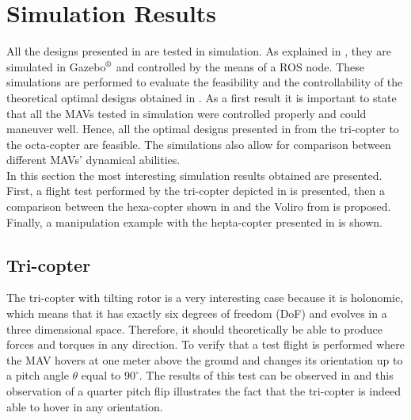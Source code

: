 \chapter{Simulation Results}
\label{sec:simulation_results}

All the designs presented in  are tested in simulation.
As explained in , they are simulated in
Gazebo$^\textrm{\textregistered}$ and controlled by the means of a ROS node.
These simulations are performed to evaluate the feasibility and  the controllability
of the theoretical optimal designs obtained in .
As a first result it is important to state that all the MAVs tested in simulation
were controlled properly and could maneuver well. Hence, all the optimal designs
presented in  from the tri-copter to the octa-copter are
feasible.
The simulations also allow for comparison between different MAVs' dynamical abilities.\\
In this section the most interesting simulation results obtained are presented.
First, a flight test performed by the tri-copter depicted in  is
presented, then a comparison between the hexa-copter shown in 
and the Voliro from \citep{kamel_voliro:_2018} is proposed. Finally, a manipulation
example with the hepta-copter presented in  is shown.

\section{Tri-copter}
\label{sec:tri_copter_sim}

The tri-copter with tilting rotor is a very interesting case because it is holonomic,
which means that it has exactly six degrees of freedom (DoF) and evolves in a
three dimensional space. Therefore, it should theoretically be able to produce forces
and torques in any direction. To verify that a test flight is performed where the MAV
hovers at one meter above the ground and changes its orientation up to a pitch angle
$\theta$ equal to $90^{\circ}$. The results of this test can be observed in
 and this observation of a quarter pitch flip illustrates the fact
that the tri-copter is indeed able to hover in any orientation.

